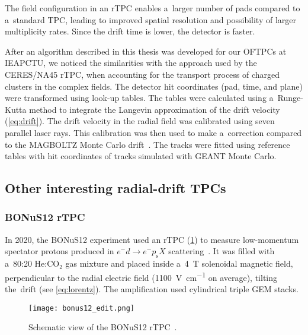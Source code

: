 			The field configuration in an \ac{rTPC} enables a~larger number of pads compared to a~standard \ac{TPC}, leading to improved spatial resolution and possibility of larger multiplicity rates. Since the drift time is lower, the detector is faster.
			
			After an algorithm described in this thesis was developed for our \acp{OFTPC} at \ac{IEAPCTU}, we noticed the similarities with the approach used by the CERES/NA45 \ac{rTPC}, when accounting for the transport process of charged clusters in the complex fields. The detector hit coordinates (pad, time, and plane) were transformed using look\nobreakdash-up tables. The tables were calculated using a~Runge-Kutta method to integrate the Langevin approximation of the drift velocity (\cref{eq:drift}). The drift velocity in the radial field was calibrated using seven parallel laser rays. This calibration was then used to make a~correction compared to the MAGBOLTZ Monte Carlo drift~\cite{magboltz}. The tracks were fitted using reference tables with hit coordinates of tracks simulated with GEANT Monte Carlo.
			
		\subsection{Other interesting radial-drift TPCs}
			\subsubsection{BONuS12 rTPC}
				In 2020, the \acf{BONuS12} experiment used an \ac{rTPC} (\cref{fig:bonus}) to measure low-momentum spectator protons produced in $e^- d \rightarrow e^- p_\text{s}X$ scattering~\cite{bonus}. It was filled with a~80:20 He:CO$_2$ gas mixture and placed inside a~\qty{4}{\tesla} solenoidal magnetic field, perpendicular to the radial electric field (\qty{1100}{\V\per\cm} on average), tilting the~drift (see \cref{eq:lorentz}). The amplification used cylindrical triple \ac{GEM} stacks.
				
				\begin{figure}
					\centering
					\texttt{[image: bonus12\_edit.png]}
					\caption{Schematic view of the \ac{BONuS12} \ac{rTPC}~\cite{bonus}.}
					\label{fig:bonus}
				\end{figure}
				
